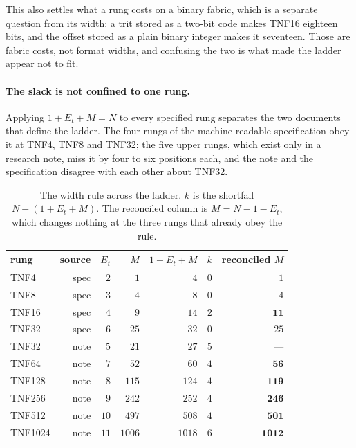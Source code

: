\documentclass[11pt]{article}
\theoremstyle{definition}
\begin{document}
This also settles what a rung costs on a binary fabric, which is a separate
question from its width: a trit stored as a two-bit code makes TNF16 eighteen
bits, and the offset stored as a plain binary integer makes it seventeen. Those
are fabric costs, not format widths, and confusing the two is what made the
ladder appear not to fit.

\paragraph{The slack is not confined to one rung.} Applying $1 + E_t + M = N$ to
every specified rung separates the two documents that define the ladder. The four
rungs of the machine-readable specification obey it at TNF4, TNF8 and TNF32;
the five upper rungs, which exist only in a research note, miss it by four to six
positions each, and the note and the specification disagree with each other about
TNF32.

\begin{table}[t]\centering
\caption{The width rule across the ladder. $k$ is the shortfall
$N - (1 + E_t + M)$. The reconciled column is $M = N - 1 - E_t$, which changes
nothing at the three rungs that already obey the rule.}
\label{tab:ladder-sweep}
\begin{tabular}{lrrrrrr}
\toprule
rung & source & $E_t$ & $M$ & $1{+}E_t{+}M$ & $k$ & reconciled $M$ \\
\midrule
TNF4    & spec & $2$  & $1$    & $4$    & $0$ & $1$ \\
TNF8    & spec & $3$  & $4$    & $8$    & $0$ & $4$ \\
TNF16   & spec & $4$  & $9$    & $14$   & $2$ & $\mathbf{11}$ \\
TNF32   & spec & $6$  & $25$   & $32$   & $0$ & $25$ \\
TNF32   & note & $5$  & $21$   & $27$   & $5$ & --- \\
TNF64   & note & $7$  & $52$   & $60$   & $4$ & $\mathbf{56}$ \\
TNF128  & note & $8$  & $115$  & $124$  & $4$ & $\mathbf{119}$ \\
TNF256  & note & $9$  & $242$  & $252$  & $4$ & $\mathbf{246}$ \\
TNF512  & note & $10$ & $497$  & $508$  & $4$ & $\mathbf{501}$ \\
TNF1024 & note & $11$ & $1006$ & $1018$ & $6$ & $\mathbf{1012}$ \\
\bottomrule
\end{tabular}
\end{table}
\end{document}

